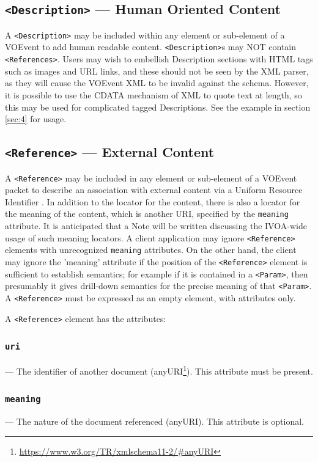 \documentclass[11pt,a4paper]{ivoa}
\begin{document}
\subsection{{\tt <Description>} --- Human Oriented Content}
\label{sec:3.8}
A {\tt <Description>} may be included within any element or sub-element of a VOEvent to add human readable content. {\tt <Description>}s may NOT contain {\tt <References>}. Users may wish to embellish Description sections with HTML tags such as images and URL links, and these should not be seen by the XML parser, as they will cause the VOEvent XML to be invalid against the schema. However, it is possible to use the CDATA mechanism of XML to quote text at length, so this may be used for complicated tagged Descriptions. See the example in section \ref{sec:4} for usage. 

\subsection{{\tt <Reference>} --- External Content}
\label{sec:3.9}
A {\tt <Reference>} may be included in any element or sub-element of a VOEvent packet to describe an association with external content via a Uniform Resource Identifier \citep{2016ivoa.spec.0523D}. In addition to the locator for the content, there is also a locator for the meaning of the content, which is another URI, specified by the {\tt meaning} attribute. It is anticipated that a Note will be written discussing the IVOA-wide usage of such meaning locators. A client application may ignore {\tt <Reference>} elements with unrecognized {\tt meaning} attributes. On the other hand, the client may ignore the 'meaning' attribute if the position of the {\tt <Reference>} element is sufficient to establish semantics; for example if it is contained in a {\tt <Param>}, then presumably it gives drill-down semantics for the precise meaning of that {\tt <Param>}. A {\tt <Reference>} must be expressed as an empty element, with attributes only. 

A {\tt <Reference>} element has the attributes: 
\subsubsection{\tt uri}\label{sec:3.9.1}--- The identifier of another document (anyURI\footnote{\url{https://www.w3.org/TR/xmlschema11-2/\#anyURI}}). This attribute must be present. 
\subsubsection{\tt meaning}\label{sec:3.9.2}--- The nature of the document referenced (anyURI). This attribute is optional. 
\end{document}
